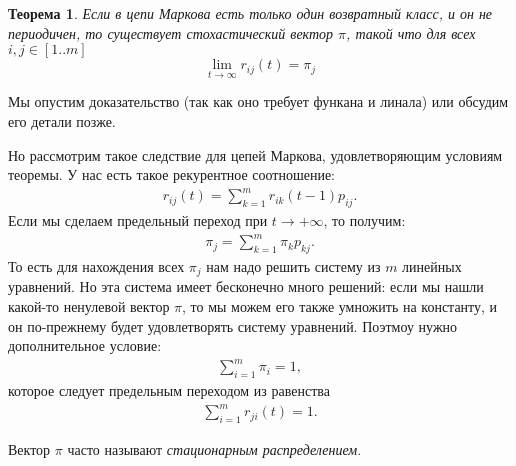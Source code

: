 \documentclass[12pt]{article}
\newtheorem{theorem}{Теорема}
\begin{document}
\begin{center}
\end{center}

\begin{theorem}
  Если в цепи Маркова есть только один возвратный класс, и он не периодичен, то существует стохастический вектор $\pi$, такой что для всех $i, j \in [1..m]$
  \[
    \lim_{t \to \infty} r_{ij}(t) = \pi_j
  \]
\end{theorem}

Мы опустим доказательство (так как оно требует функана и линала) или обсудим его детали позже.

Но рассмотрим такое следствие для цепей Маркова, удовлетворяющим условиям теоремы. У нас есть такое рекурентное соотношение:
\begin{align*}
  r_{ij}(t) = \sum_{k = 1}^m r_{ik}(t - 1) p_{ij}.
\end{align*}
Если мы сделаем предельный переход при $t \to + \infty$, то получим:
\begin{align*}
  \pi_j = \sum_{k = 1}^m \pi_k p_{kj}.
\end{align*}
То есть для нахождения всех $\pi_j$ нам надо решить систему из $m$ линейных уравнений. Но эта система имеет бесконечно много решений: если мы нашли какой-то ненулевой вектор $\pi$, то мы можем его также умножить на константу, и он по-прежнему будет удовлетворять систему уравнений.  Поэтмоу нужно дополнительное условие:
\begin{align*}
  \sum_{i = 1}^m \pi_i = 1,
\end{align*}
которое следует предельным переходом из равенства
\begin{align*}
  \sum_{i = 1}^m r_{ji}(t) = 1.
\end{align*}

Вектор $\pi$ часто называют \emph{стационарным распределением}.
\end{document}
